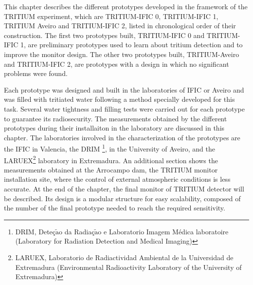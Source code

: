 This chapter describes the different prototypes developed in the framework of the TRITIUM experiment, which are TRITIUM-IFIC 0, TRITIUM-IFIC 1, TRITIUM Aveiro and TRITIUM-IFIC 2, listed in chronological order of their construction. The first two prototypes built, TRITIUM-IFIC 0 and TRITIUM-IFIC 1, are preliminary prototypes used to learn about tritium detection and to improve the monitor design. The other two prototypes built, TRITIUM-Aveiro and TRITIUM-IFIC 2, are prototypes with a design in which no significant problems were found. %

Each prototype was designed and built in the laboratories of IFIC or Aveiro and was filled with tritiated water following a method specially developed for this task. Several water tightness and filling tests were carried out for each prototype to guarantee its radiosecurity. The measurements obtained by the different prototypes during their installaiton in the laboratory are discussed in this chapter. The laboratories involved in the characterization of the prototypes are the IFIC in Valencia, the DRIM \footnote{DRIM, Deteç$\tilde{\text{a}}$o da Radiaç$\tilde{\text{a}}$o e Laboratorio Imagem Médica laboratoire (Laboratory for Radiation Detection and Medical Imaging)}, in the University of Aveiro, and the LARUEX\footnote{LARUEX, Laboratorio de Radiactividad Ambiental de la Universidad de Extremadura (Environmental Radioactivity Laboratory of the University of Extremadura)} laboratory in Extremadura. An additional section shows the measurements obtained at the Arrocampo dam, the TRITIUM monitor installation site, where the control of external atmospheric conditions is less accurate. At the end of the chapter, the final monitor of TRITIUM detector will be described. Its design is a modular structure for easy scalability, composed of the number of the final prototype needed to reach the required sensitivity.